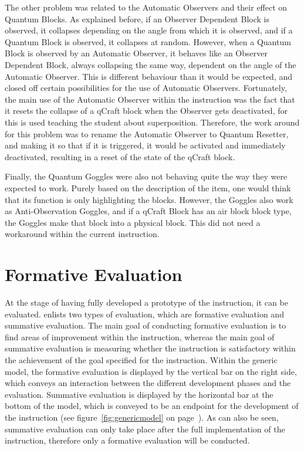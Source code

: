 \documentclass[11pt,twoside]{report} %
\begin{document}
The other problem was related to the Automatic Observers and their effect on Quantum Blocks. As explained before, if an Observer Dependent Block is observed, it collapses depending on the angle from which it is observed, and if a Quantum Block is observed, it collapses at random. However, when a Quantum Block is observed by an Automatic Observer, it behaves like an Observer Dependent Block, always collapsing the same way, dependent on the angle of the Automatic Observer. This is different behaviour than it would be expected, and closed off certain possibilities for the use of Automatic Observers. Fortunately, the main use of the Automatic Observer within the instruction was the fact that it resets the collapse of a qCraft block when the Observer gets deactivated, for this is used teaching the student about superposition. Therefore, the work around for this problem was to rename the Automatic Observer to Quantum Resetter, and making it so that if it is triggered, it would be activated and immediately deactivated, resulting in a reset of the state of the qCraft block.

Finally, the Quantum Goggles were also not behaving quite the way they were expected to work. Purely based on the description of the item, one would think that its function is only highlighting the blocks. However, the Goggles also work as Anti-Observation Goggles, and if a qCraft Block has an air block block type, the Goggles make that block into a physical block. This did not need a workaround within the current instruction.


\part{Formative Evaluation}
\thispagestyle{fancy}

At the stage of having fully developed a prototype of the instruction, it can be evaluated.  enlists two types of evaluation, which are formative evaluation and summative evaluation. The main goal of conducting formative evaluation is to find areas of improvement within the instruction, whereas the main goal of summative evaluation is measuring whether the instruction is satisfactory within the achievement of the goal specified for the instruction. Within the generic model, the formative evaluation is displayed by the vertical bar on the right side, which conveys an interaction between the different development phases and the evaluation. Summative evaluation is displayed by the horizontal bar at the bottom of the model, which is conveyed to be an endpoint for the development of the instruction (see figure~\ref{fig:genericmodel} on page~\pageref{fig:genericmodel}). As can also be seen, summative evaluation can only take place after the full implementation of the instruction, therefore only a formative evaluation will be conducted.
\end{document}
